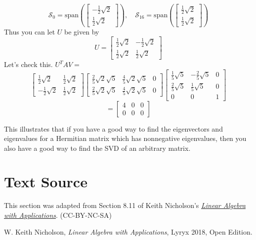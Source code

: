 \documentclass{ximera}
\begin{document}
\begin{example}
\begin{explanation}
\begin{equation*}
\mathcal{S}_0=\mbox{span}\left(\left[ 
\begin{array}{c}
-\frac{1}{2}\sqrt{2} \\
\frac{1}{2}\sqrt{2}
\end{array}
\right] \right),\quad\mathcal{S}_{16}=\mbox{span}\left( \left[ 
\begin{array}{c}
\frac{1}{2}\sqrt{2} \\
\frac{1}{2}\sqrt{2}
\end{array}
\right] \right)
\end{equation*}
Thus you can let $U$ be given by
\begin{equation*}
U=\left[ 
\begin{array}{cc}
\frac{1}{2}\sqrt{2} & -\frac{1}{2}\sqrt{2} \\
\frac{1}{2}\sqrt{2} & \frac{1}{2}\sqrt{2}
\end{array}
\right]
\end{equation*}
Let's check this. $U^TAV=$
\begin{equation*}
\left[ 
\begin{array}{cc}
\frac{1}{2}\sqrt{2} & \frac{1}{2}\sqrt{2} \\
-\frac{1}{2}\sqrt{2} & \frac{1}{2}\sqrt{2}
\end{array}
\right] \left[  
\begin{array}{ccc}
\frac{2}{5}\sqrt{2}\sqrt{5} & \frac{4}{5}\sqrt{2}\sqrt{5} & 0 \\
\frac{2}{5}\sqrt{2}\sqrt{5} & \frac{4}{5}\sqrt{2}\sqrt{5} & 0
\end{array}
\right] \left[
\begin{array}{ccc}
\frac{1}{5}\sqrt{5} & -\frac{2}{5}\sqrt{5} & 0 \\
\frac{2}{5}\sqrt{5} & \frac{1}{5}\sqrt{5} & 0 \\
0 & 0 & 1
\end{array}
\right]
\end{equation*}
\begin{equation*}
=\left[
\begin{array}{ccc}
4 & 0 & 0 \\
0 & 0 & 0
\end{array}
\right]
\end{equation*}
\end{explanation}
\end{example}
 
This illustrates that if you have a good way to find the eigenvectors and
eigenvalues for a Hermitian matrix which has nonnegative eigenvalues, then
you also have a good way to find the SVD of an
arbitrary matrix.
 
 
 
\section*{Text Source} This section was adapted from Section 8.11 of Keith Nicholson's \href{https://open.umn.edu/opentextbooks/textbooks/linear-algebra-with-applications}{\it Linear Algebra with Applications}. (CC-BY-NC-SA)
 
W. Keith Nicholson, {\it Linear Algebra with Applications}, Lyryx 2018, Open Edition.
\end{document}
